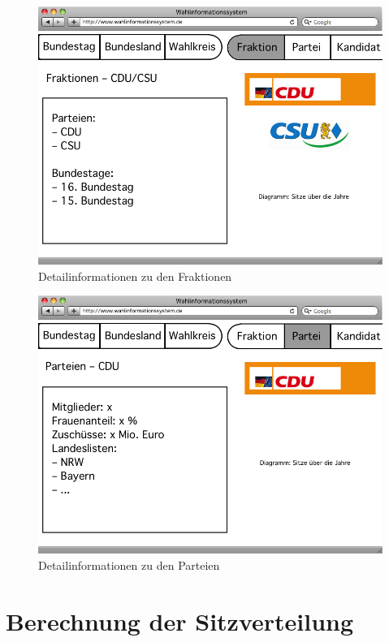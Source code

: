 \documentclass[a4paper]{article}
\begin{document}
\begin{figure}[!h]
\centering
\includegraphics[scale=0.4]{Mockups/fraktion}
\caption{Detailinformationen zu den Fraktionen}
\end{figure}

\begin{figure}[!h]
\centering
\includegraphics[scale=0.4]{Mockups/partei}
\caption{Detailinformationen zu den Parteien}
\end{figure}

\section{Berechnung der Sitzverteilung}
\end{document}
